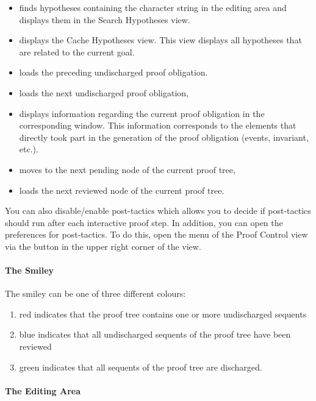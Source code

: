 \begin{itemize}
    \item {} finds hypotheses containing the character string in the editing area and displays them in the Search Hypotheses view.
    \item {} displays the \textsf{Cache Hypotheses} view. This view displays all hypotheses that are related to the current goal.
    \item {} loads the preceding undischarged proof obligation.
    \item {} loads the next undischarged proof obligation,
    \item {} displays information regarding the current proof obligation in the corresponding window. This information corresponds to the elements that directly took part in the generation of the proof obligation (events, invariant, etc.).
    \item {} moves to the next pending node of the current proof tree,
    \item {} loads the next reviewed node of the current proof tree.
\end{itemize}

You can also disable/enable post-tactics which allows you to decide if post-tactics should run after each interactive proof step. In addition, you can open the preferences for post-tactics. To do this, open the menu of the \textsf{Proof Control} view via the  button in the upper right corner of the view.

\paragraph{The Smiley}

The smiley can be one of three different colours: 

\begin{enumerate}
	\item red indicates that the proof tree contains one or more undischarged sequents
	\item blue indicates that all undischarged sequents of the proof tree have been reviewed
	\item green indicates that all sequents of the proof tree are discharged.
\end{enumerate}

\paragraph{The Editing Area}

